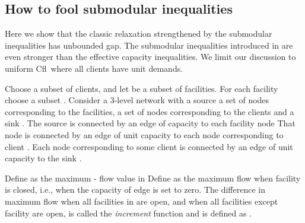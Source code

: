 \documentclass[11pt]{article}
\newcommand{\cfl}{{\sc Cfl}}
\begin{document}
\begin{comment}
and the capacity of the cheap is . We select
randomly  some    clients  in    and  we  toss  the
corresponding balls in the bin of .  We randomly toss the
remaining balls to the slots of the bins of the cheap facilities.

Note that  the above experiment  induces a distribution  over feasible
integer solutions since  all the defined bin capacities  are less than
 (this is by  the choice of the size of )  and every client is
assigned to exactly one opened facility in each outcome.  We do not need
this distribution to be assignment-symmetric. Observe that the expected
vector   with  respect   to  the   latter  distribution   is  solution
. Finally, note that we  once again treated the capacities  of
the bins  as
being integral.  For fractional bin capacities (which is
actually  always the case  for the  defined 's)  we can  define the
experiment in a similar way to the proof of Lemma \ref{assi-sym}.  
\end{proof}

\end{comment}





\subsection{How to fool submodular inequalities} 

Here we show that the classic relaxation strengthened by the
submodular inequalities has unbounded gap. The submodular inequalities
introduced in \cite{AardalPW95} are even stronger than the effective
capacity inequalities. We limit our discussion to uniform \cfl\ where
all clients have unit demands. 

Choose a subset  of  clients, and let  be
a subset  of facilities.  For each  facility   choose a subset
.  Consider a 3-level network  with a source  a set of
nodes corresponding to the facilities, a set of nodes corresponding
to the clients and a sink . The source  is connected by an edge of capacity
 to each facility node  That node 
 is connected by an  edge of unit
capacity to each node corresponding to client  .
Each node corresponding to some client is connected by an edge of unit
capacity to the sink .


Define    as the maximum - flow value in  
Define  as the maximum flow when facility  is
closed, i.e., when the
capacity of edge  is set to zero. 
The difference in maximum flow when all facilities in 
are open, and when all facilities except facility  are open, is
called the 
{\em increment}
function and is defined as .
\end{document}
